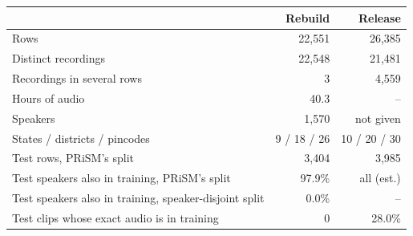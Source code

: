 \begin{tabularx}{\linewidth}{@{}>{\raggedright\arraybackslash}Xrr@{}}
\toprule
 & Rebuild & Release \\
\midrule
Rows & 22,551 & 26,385 \\
Distinct recordings & 22,548 & 21,481 \\
Recordings in several rows & 3 & 4,559 \\
Hours of audio & 40.3 & -- \\
Speakers & 1,570 & not given \\
States / districts / pincodes & 9 / 18 / 26 & 10 / 20 / 30 \\
Test rows, PRiSM's split & 3,404 & 3,985 \\
Test speakers also in training, PRiSM's split & 97.9\% & all (est.) \\
Test speakers also in training, speaker-disjoint split & 0.0\% & -- \\
Test clips whose exact audio is in training & 0 & 28.0\% \\
\bottomrule
\end{tabularx}
